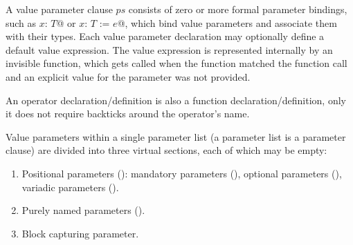 A value parameter clause $ps$ consists of zero or more formal parameter bindings, such as \lstinline@$x$: $T$@ or \lstinline@$x$: $T$ := $e$@, which bind value parameters and associate them with their types. Each value parameter declaration may optionally define a default value expression. The value expression is represented internally by an invisible function, which gets called when the function matched the function call and an explicit value for the parameter was not provided.

An operator declaration/definition is also a function declaration/definition, only it does not require backticks around the operator's name. 

Value parameters within a single parameter list (a parameter list is a parameter clause) are divided into three virtual sections, each of which may be empty:
\begin{enumerate}
  \item Positional parameters (): mandatory parameters (), optional parameters (), variadic parameters (). 
  \item Purely named parameters (). 
  \item Block capturing parameter. 
\end{enumerate}




